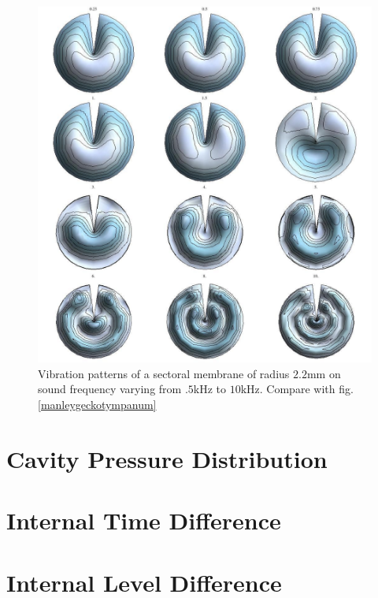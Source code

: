 \begin{figure}[ht!]
 \centering
 \includegraphics[width=.75\linewidth]{Diagrams/SectorMembraneModes/sector_membrane_all.png}
 \caption[Sectoral membrane vibration profiles.]{Vibration patterns of a sectoral membrane
 of radius $2.2$mm on sound frequency varying from $.5$kHz to $10$kHz. Compare with fig. \ref{manleygeckotympanum}}
  \label{sectormembraneprofile}
\end{figure}

\section{Cavity Pressure Distribution}

\section{Internal Time Difference}

\section{Internal Level Difference}
